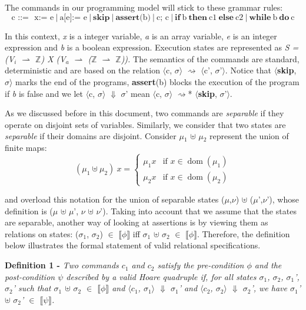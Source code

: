 The commands in our programming model will stick to these grammar rules:
\[ \text{c ::=} \ \ \ \text{x:= e} \ | \ \text{a[e]:= e} \ | \ \textbf{skip} \ | \ \textbf{assert} \text{(b)} \ |
                    \ \text{c; c} \ | \ \textbf{if} \ \text{b} \ \textbf{then} \ \text{c1} \ \textbf{else} \ \text{c2} \ | \ \textbf{while} \ \text{b} \ \textbf{do} \ \text{c} \]

In this context, \emph{x} is a integer variable, \emph{a} is an array variable, \emph{e} is an integer expression and \emph{b} is a boolean expression.
Execution states are represented as \emph{S = (V$_i$ $\rightharpoonup$ $\mathbb{Z}$) X (V$_a$ $\rightharpoonup$ ($\mathbb{Z}$ $\rightharpoonup$ $\mathbb{Z}$)).}
The semantics of the commands are standard, deterministic and are based on the relation $\langle$c, $\sigma$$\rangle$ $\rightsquigarrow$ $\langle$c', $\sigma$'$\rangle$.
Notice that $\langle$\textbf{skip}, $\sigma$$\rangle$ marks the end of the programs, \textbf{assert}(b) blocks the execution of the program if \emph{b} is false and we let $\langle$c, $\sigma$$\rangle$ $\Downarrow$ $\sigma$' mean $\langle$c, $\sigma$$\rangle$ $\rightsquigarrow$* $\langle$\textbf{skip}, $\sigma$'$\rangle$.

As we discussed before in this document, two commands are \emph{separable} if they operate on disjoint sets of variables.
Similarly, we consider that two states are \emph{separable} if their domains are disjoint.
Consider $\mu$$_1$ $\uplus$ $\mu$$_2$ represent the union of finite maps:
\[
(\mu_1 \uplus \mu_2) \ x =
\begin{cases}
    \mu_1 x & \text{if } x \in \operatorname{dom}(\mu_1) \\
    \mu_2 x & \text{if } x \in \operatorname{dom}(\mu_2)
\end{cases}
\]

and overload this notation for the union of separable states ($\mu$,$\nu$) $\uplus$ ($\mu$',$\nu$'), whose definition is ($\mu$ $\uplus$ $\mu$', $\nu$ $\uplus$ $\nu$').
Taking into account that we assume that the states are separable, another way of looking at assertions is by viewing them as relations on states: ($\sigma$$_1$, $\sigma$$_2$) $\in$ $\llbracket$$\phi$$\rrbracket$ iff $\sigma$$_1$ $\uplus$ $\sigma$$_2$ $\in$ $\llbracket$$\phi$$\rrbracket$.
Therefore, the definition below illustrates the formal statement of valid relational specifications.
\bigskip

\textbf{Definition 1 -}  \emph{Two commands $c_1$ and $c_2$ satisfy the pre-condition $\phi$ and the post-condition $\psi$ described by a valid Hoare quadruple if,
                                for all states $\sigma$$_1$, $\sigma$$_2$, $\sigma$$_1$', $\sigma$$_2$' such that $\sigma_1$ $\uplus$ $\sigma_2$ $\in$ $\llbracket$$\phi$$\rrbracket$
                                and $\langle$$c_1$, $\sigma$$_1$$\rangle$ $\Downarrow$ $\sigma$$_1$' and $\langle$$c_2$, $\sigma$$_2$$\rangle$ $\Downarrow$ $\sigma$$_2$', we have $\sigma_1$' $\uplus$ $\sigma_2$' $\in$ $\llbracket$$\psi$$\rrbracket$.}

